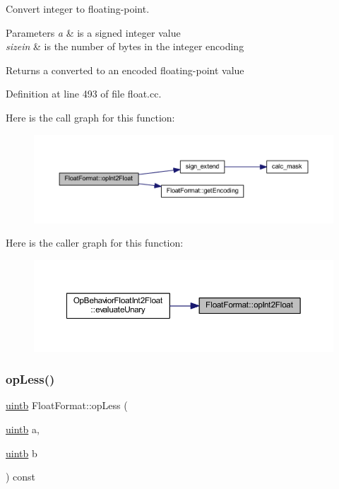 Convert integer to floating-\/point. 


\begin{DoxyParams}{Parameters}
{\em a} & is a signed integer value \\
\hline
{\em sizein} & is the number of bytes in the integer encoding \\
\hline
\end{DoxyParams}
\begin{DoxyReturn}{Returns}
a converted to an encoded floating-\/point value 
\end{DoxyReturn}


Definition at line 493 of file float.\+cc.

Here is the call graph for this function\+:
\nopagebreak
\begin{figure}[H]
\begin{center}
\leavevmode
\includegraphics[width=350pt]{class_float_format_a610b9f8efe3b41368250940184691156_cgraph}
\end{center}
\end{figure}
Here is the caller graph for this function\+:
\nopagebreak
\begin{figure}[H]
\begin{center}
\leavevmode
\includegraphics[width=350pt]{class_float_format_a610b9f8efe3b41368250940184691156_icgraph}
\end{center}
\end{figure}
\mbox{\label{class_float_format_a257b216d9b9e5aad3b693df46624cc6d}} 
\subsubsection{\texorpdfstring{opLess()}{opLess()}}
{\footnotesize\ttfamily \mbox{\hyperlink{types_8h_a2db313c5d32a12b01d26ac9b3bca178f}{uintb}} Float\+Format\+::op\+Less (\begin{DoxyParamCaption}\item[{\mbox{\hyperlink{types_8h_a2db313c5d32a12b01d26ac9b3bca178f}{uintb}}}]{a,  }\item[{\mbox{\hyperlink{types_8h_a2db313c5d32a12b01d26ac9b3bca178f}{uintb}}}]{b }\end{DoxyParamCaption}) const}



